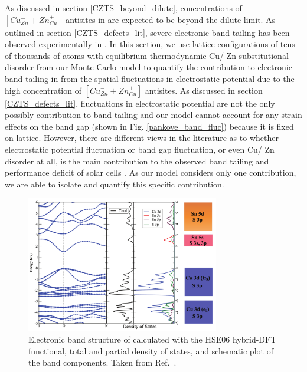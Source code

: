 \documentclass[11pt, twoside]{report}
\begin{document}
As discussed in section \ref{CZTS_beyond_dilute}, concentrations of $[Cu_{Zn}^{-} + Zn_{Cu}^{+}]$ antisites in {\CZTS} are expected to be beyond the dilute limit. As outlined in section \ref{CZTS_defects_lit}, severe electronic band tailing has been observed experimentally in {\CZTS} \cite{band_tail, kesterite_band_tails}. In this section, we use lattice configurations of tens of thousands of atoms with equilibrium thermodynamic Cu/ Zn substitutional disorder from our Monte Carlo model to quantify the contribution to electronic band tailing in {\CZTS} from the spatial fluctuations in electrostatic potential due to the high concentration of $[Cu_{Zn}^{-} + Zn_{Cu}^{+}]$ antisites. 
As discussed in  section \ref{CZTS_defects_lit}, fluctuations in electrostatic potential are not the only possibly contribution to band tailing and our model cannot account for any strain effects on the band gap (shown in Fig. \ref{pankove_band_fluc}) because it is fixed on lattice. However, there are different views in the literature as to whether electrostatic potential fluctuation or band gap fluctuation, or even Cu/ Zn disorder at all, is the main contribution to the observed band tailing and performance deficit of {\CZTS} solar cells \cite{culprit, kesterite_band_tails, band_tail}. As our model considers only one contribution, we are able to isolate and quantify this specific contribution.

\begin{figure}[h!]
  \centering
    \includegraphics[width=0.75\textwidth]{figures/CZTS_band_structure.png}
    \caption[Electronic band structure of {\CZTS} calculated with the HSE06 hybrid-DFT functional, total and partial density of states, and schematic plot of the band components.]{Electronic band structure of {\CZTS} calculated with the HSE06 hybrid-DFT functional, total and partial density of states, and schematic plot of the band components. Taken from Ref.~.}
  \label{CZTS_band_structure}
\end{figure}
\end{document}
